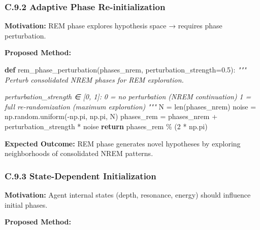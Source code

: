 \documentclass[
]{article}
\newenvironment{Shaded}{}{}
\newcommand{\BuiltInTok}[1]{\textcolor[rgb]{0.00,0.50,0.00}{#1}}
\newcommand{\CommentTok}[1]{\textcolor[rgb]{0.38,0.63,0.69}{\textit{#1}}}
\newcommand{\ControlFlowTok}[1]{\textcolor[rgb]{0.00,0.44,0.13}{\textbf{#1}}}
\newcommand{\DecValTok}[1]{\textcolor[rgb]{0.25,0.63,0.44}{#1}}
\newcommand{\FloatTok}[1]{\textcolor[rgb]{0.25,0.63,0.44}{#1}}
\newcommand{\KeywordTok}[1]{\textcolor[rgb]{0.00,0.44,0.13}{\textbf{#1}}}
\newcommand{\NormalTok}[1]{#1}
\newcommand{\OperatorTok}[1]{\textcolor[rgb]{0.40,0.40,0.40}{#1}}
\begin{document}
\subsubsection{C.9.2 Adaptive Phase
Re-initialization}\label{c.9.2-adaptive-phase-re-initialization}

\textbf{Motivation:} REM phase explores hypothesis space → requires
phase perturbation.

\textbf{Proposed Method:}

\begin{Shaded}
\begin{Highlighting}[]
\KeywordTok{def}\NormalTok{ rem\_phase\_perturbation(phases\_nrem, perturbation\_strength}\OperatorTok{=}\FloatTok{0.5}\NormalTok{):}
    \CommentTok{"""}
\CommentTok{    Perturb consolidated NREM phases for REM exploration.}

\CommentTok{    perturbation\_strength ∈ [0, 1]:}
\CommentTok{        0 = no perturbation (NREM continuation)}
\CommentTok{        1 = full re{-}randomization (maximum exploration)}
\CommentTok{    """}
\NormalTok{    N }\OperatorTok{=} \BuiltInTok{len}\NormalTok{(phases\_nrem)}
\NormalTok{    noise }\OperatorTok{=}\NormalTok{ np.random.uniform(}\OperatorTok{{-}}\NormalTok{np.pi, np.pi, N)}
\NormalTok{    phases\_rem }\OperatorTok{=}\NormalTok{ phases\_nrem }\OperatorTok{+}\NormalTok{ perturbation\_strength }\OperatorTok{*}\NormalTok{ noise}
    \ControlFlowTok{return}\NormalTok{ phases\_rem }\OperatorTok{\%}\NormalTok{ (}\DecValTok{2} \OperatorTok{*}\NormalTok{ np.pi)}
\end{Highlighting}
\end{Shaded}

\textbf{Expected Outcome:} REM phase generates novel hypotheses by
exploring neighborhoods of consolidated NREM patterns.

\subsubsection{C.9.3 State-Dependent
Initialization}\label{c.9.3-state-dependent-initialization}

\textbf{Motivation:} Agent internal states (depth, resonance, energy)
should influence initial phases.

\textbf{Proposed Method:}
\end{document}
